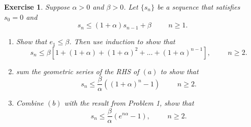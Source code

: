 \documentclass[a4paper,12pt]{scrartcl} %
\newcounter{customcounter}
\theoremstyle{darktheorem}
\newtheorem{exercise}[customcounter]{Exercise}
\begin{document}
\begin{exercise}
    Suppose $\alpha > 0$ and $\beta > 0$. Let $\{s_n\}$ be a sequence that satisfies $s_0 = 0$ and 
    \[
        s_n \le (1+\alpha)s_{n-1} + \beta \hspace{1cm} n \ge 1
    .\] 
    \begin{enumerate}
        \item Show that $e_1 \le \beta$. Then use induction to show that
            \[
                s_n \le \beta[1 + (1+ \alpha) + (1+\alpha)^2 + ... + (1 + \alpha)^{n-1}], \hspace{1cm} n \ge 2
            .\] 
        \item sum the geometric series of the RHS of $(a)$ to show that
            \[
                s_n \le \frac{\beta}{\alpha}((1+\alpha)^{n}-1) \hspace{1cm} n\ge 2
            .\] 
        \item Combine $(b)$ with the result from Problem 1, show that
            \[
                s_n \le \frac{\beta}{\alpha}(e^{n \alpha} - 1), \hspace{1cm} n \ge 2
            .\] 
    \end{enumerate}
\end{exercise}
\end{document}
